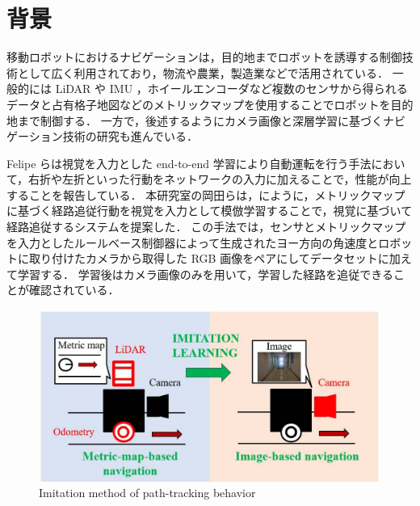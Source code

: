 
\section{背景}
移動ロボットにおけるナビゲーションは，目的地までロボットを誘導する制御技術として広く利用されており，物流や農業，製造業などで活用されている．
一般的には LiDAR や IMU ，ホイールエンコーダなど複数のセンサから得られるデータと占有格子地図などのメトリックマップを使用することでロボットを目的地まで制御する．
一方で，後述するようにカメラ画像と深層学習に基づくナビゲーション技術の研究も進んでいる．

Felipe ら\cite{codevilla2018endtoend}は視覚を入力とした end-to-end 学習により自動運転を行う手法において，右折や左折といった行動をネットワークの入力に加えることで，性能が向上することを報告している．
本研究室の岡田ら\cite{okada2020}\cite{okada2021}は，にように，メトリックマップに基づく経路追従行動を視覚を入力として模倣学習することで，視覚に基づいて経路追従するシステムを提案した．
この手法では，センサとメトリックマップを入力としたルールベース制御器によって生成されたヨー方向の角速度とロボットに取り付けたカメラから取得した RGB 画像をペアにしてデータセットに加えて学習する．
学習後はカメラ画像のみを用いて，学習した経路を追従できることが確認されている．
\begin{figure}[h]
     \centering
     \includegraphics[width=120mm]{images/pdf/ishiguro/system.pdf}
     \caption{Imitation method of path-tracking behavior}
     \label{fig:imitation_sys}
\end{figure}

